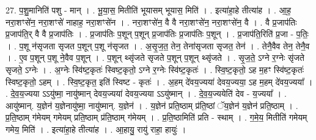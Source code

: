 \documentclass[17pt]{extarticle}
\begin{document}
27. प॒शु॒मानिति॑ पशु - मान् । . भू॒या॒स॒ मितीति॑ भूयासम् भूयास॒ मिति॑ । . इत्या॑हा॒हे तीत्या॑ह । . आ॒ह॒ नरा॒शꣳसे॑न॒ नरा॒शꣳसे॑ नाहाह॒ नरा॒शꣳसे॑न । . नरा॒शꣳसे॑न॒ वै वै नरा॒शꣳसे॑न॒ नरा॒शꣳसे॑न॒ वै । . वै प्र॒जाप॑तिः प्र॒जाप॑ति॒र् वै वै प्र॒जाप॑तिः । . प्र॒जाप॑तिः प॒शून् प॒शून् प्र॒जाप॑तिः प्र॒जाप॑तिः प॒शून् । . प्र॒जाप॑ति॒रिति॑ प्र॒जा - प॒तिः॒ । . प॒शू न॑सृजता सृजत प॒शून् प॒शू न॑सृजत । . अ॒सृ॒ज॒त॒ तेन॒ तेना॑सृजता सृजत॒ तेन॑ । . तेनै॒वैव तेन॒ तेनै॒व । . ए॒व प॒शून् प॒शू ने॒वैव प॒शून् । . प॒शून् थ्सृ॑जते सृजते प॒शून् प॒शून् थ्सृ॑जते । . सृ॒ज॒ते॒ ऽग्ने र॒ग्नेः सृ॑जते सृजते॒ ऽग्नेः । . अ॒ग्नेः स्वि॑ष्ट॒कृतः॑ स्विष्ट॒कृतो॒ ऽग्ने र॒ग्नेः स्वि॑ष्ट॒कृतः॑ । . स्वि॒ष्ट॒कृतो॒ ऽह म॒हꣳ स्वि॑ष्ट॒कृतः॑ स्विष्ट॒कृतो॒ ऽहम् । . स्वि॒ष्ट॒कृत॒ इति॑ स्विष्ट - कृतः॑ । . अ॒हम् दे॑वय॒ज्यया॑ देवय॒ज्यया॒ ऽह म॒हम् दे॑वय॒ज्यया᳚ । . दे॒व॒य॒ज्यया ऽऽयु॑ष्मा॒ नायु॑ष्मान् देवय॒ज्यया॑ देवय॒ज्यया ऽऽयु॑ष्मान् । . दे॒व॒य॒ज्ययेति॑ देव - य॒ज्यया᳚ । . आयु॑ष्मान्. य॒ज्ञेन॑ य॒ज्ञेनायु॑ष्मा॒ नायु॑ष्मान्. य॒ज्ञेन॑ । . य॒ज्ञेन॑ प्रति॒ष्ठाम् प्र॑ति॒ष्ठां ॅय॒ज्ञेन॑ य॒ज्ञेन॑ प्रति॒ष्ठाम् । . प्र॒ति॒ष्ठाम् ग॑मेयम् गमेयम् प्रति॒ष्ठाम् प्र॑ति॒ष्ठाम् ग॑मेयम् । . प्र॒ति॒ष्ठामिति॑ प्रति - स्थाम् । . ग॒मे॒य॒ मितीति॑ गमेयम् गमेय॒ मिति॑ । . इत्या॑हा॒हे तीत्या॑ह । . आ॒हायु॒ रायु॑ राहा॒ हायुः॑ । \newline
\end{document}
